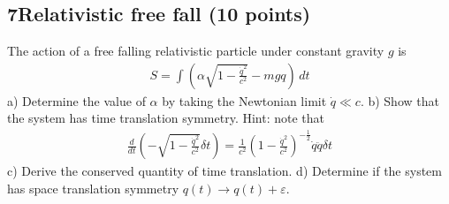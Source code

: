 \documentclass[12pt]{book} %
\numberwithin{equation}{chapter}
\def\a{\alpha}
\def\d{\delta}
\def\e{\varepsilon}
\def\lq{\hspace{2.5ex}}
\begin{document}
\subsection*{7\lq Relativistic free fall (10 points)}
The action of a free falling relativistic particle under constant gravity $g$ is
\begin{align*}
S=\int \left(\a\sqrt{1-\frac{\dot{q}^{2}}{c^{2}}}-mgq\right)\,dt
\end{align*}
a) Determine the value of $\a$ by taking the Newtonian limit $\dot{q}\ll c$.\bigskip\newline
b) Show that the system has time translation symmetry.\bigskip\newline
Hint: note that
\begin{align*}
\frac{d}{dt}\left(-\sqrt{1-\frac{\dot{q}^{2}}{c^{2}}}\d t\right)=\frac{1}{c^{2}}\left(1-\frac{\dot{q}^{2}}{c^{2}}\right)^{-\frac{1}{2}}\dot{q}\ddot{q}\d t
\end{align*}
c) Derive the conserved quantity of time translation.\bigskip\newline
d) Determine if the system has space translation symmetry $q(t)\to q(t)+\e$.
\end{document}
